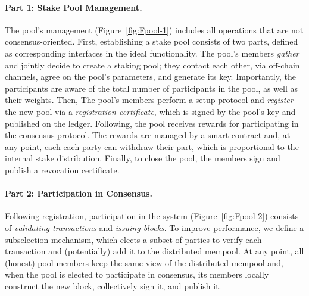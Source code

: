 \paragraph{\bf Part 1: Stake Pool Management.}
The pool's management (Figure~\ref{fig:Fpool-1}) includes all operations that
are not consensus-oriented.  First, establishing a stake pool consists of two
parts, defined as corresponding interfaces in the ideal functionality. The
pool's members \emph{gather} and jointly decide to create a staking pool; they
contact each other, \eg via off-chain channels, agree on the pool's parameters,
and generate its key.  Importantly, the participants are aware of the total
number of participants in the pool, as well as their weights. Then, The pool's
members perform a setup protocol and \emph{register} the new pool via a
\emph{registration certificate}, which is signed by the pool's key and
published on the ledger.
Following, the pool receives rewards for participating in the consensus
protocol. The rewards are managed by a smart contract and, at any point, each
each party can withdraw their part, which is proportional to the internal stake
distribution. Finally, to close the pool, the members sign and publish a
revocation certificate.

\paragraph{\bf Part 2: Participation in Consensus.}
Following registration, participation in the system (Figure~\ref{fig:Fpool-2})
consists of \emph{validating transactions} and \emph{issuing blocks}. To
improve performance, we define a subselection mechanism, which elects a subset
of parties to verify each transaction and (potentially) add it to the
distributed mempool. At any point, all (honest) pool members keep the same view
of the distributed mempool and, when the pool is elected to participate in
consensus, its members locally construct the new block, collectively sign it,
and publish it.

